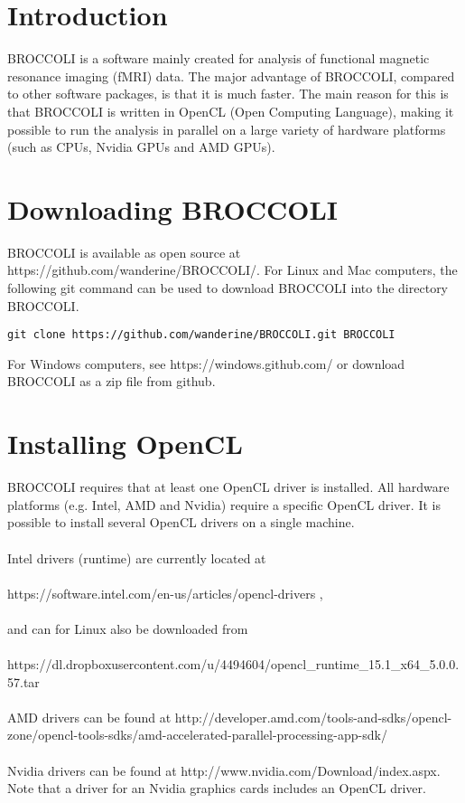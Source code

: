 \section{Introduction}

BROCCOLI is a software mainly created for analysis of functional magnetic resonance imaging (fMRI) data. The major advantage of BROCCOLI, compared to other software packages, is that it is much faster. The main reason for this is that BROCCOLI is written in OpenCL (Open Computing Language), making it possible to run the analysis in parallel on a large variety of hardware platforms (such as CPUs, Nvidia GPUs and AMD GPUs). 

\section{Downloading BROCCOLI}

BROCCOLI is available as open source at https://github.com/wanderine/BROCCOLI/. For Linux and Mac computers, the following git command can be used to download BROCCOLI into the directory BROCCOLI. 

\begin{verbatim}
git clone https://github.com/wanderine/BROCCOLI.git BROCCOLI
\end{verbatim}
For Windows computers, see https://windows.github.com/ or download BROCCOLI as a zip file from github. 

\section{Installing OpenCL}

BROCCOLI requires that at least one OpenCL driver is installed. All hardware platforms (e.g. Intel, AMD and Nvidia) require a specific OpenCL driver. It is possible to install several OpenCL drivers on a single machine. \\ \\ Intel drivers (runtime) are currently located at \\ \\ https://software.intel.com/en-us/articles/opencl-drivers , \\ \\ and can for Linux also be downloaded from \\ \\ https://dl.dropboxusercontent.com/u/4494604/opencl\_runtime\_15.1\_x64\_5.0.0.57.tar
\\ \\ AMD drivers can be found at http://developer.amd.com/tools-and-sdks/opencl-zone/opencl-tools-sdks/amd-accelerated-parallel-processing-app-sdk/ \\ \\ Nvidia drivers can be found at http://www.nvidia.com/Download/index.aspx. Note that a driver for an Nvidia graphics cards includes an OpenCL driver. 

